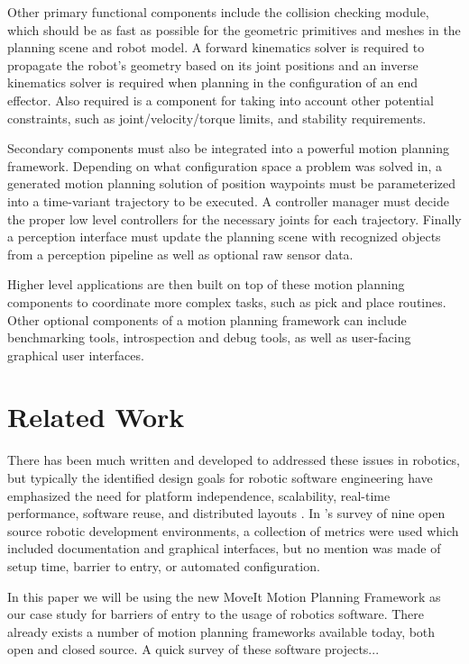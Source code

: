 \documentclass[10pt,journal,compsoc]{joser1}
\begin{document}
{Other primary functional components include the collision checking module, which should be as fast as possible for the geometric primitives and meshes in the planning scene and robot model. A forward kinematics solver is required to propagate the robot's geometry based on its joint positions and an inverse kinematics solver is required when planning in the configuration of an end effector. Also required is a component for taking into account other potential constraints, such as joint/velocity/torque limits, and stability requirements. 

Secondary components must also be integrated into a powerful motion planning framework. Depending on what configuration space a problem was solved in, a generated motion planning solution of position waypoints must be parameterized into a time-variant trajectory to be executed. A controller manager must decide the proper low level controllers for the necessary joints for each trajectory. Finally a perception interface must update the planning scene with recognized objects from a perception pipeline as well as optional raw sensor data.

Higher level applications are then built on top of these motion planning components to coordinate more complex tasks, such as pick and place routines. Other optional components of a motion planning framework can include benchmarking tools, introspection and debug tools, as well as user-facing graphical user interfaces. 


\section{Related Work}

There has been much written and developed to addressed these issues in robotics, but typically the identified design goals for robotic software engineering have emphasized the need for platform independence, scalability, real-time performance, software reuse, and distributed layouts \cite{realtime_framework, collett2005player, kramer2007development}. In \cite{kramer2007development}'s survey of nine open source robotic development environments, a collection of metrics were used which included documentation and graphical interfaces, but no mention was made of setup time, barrier to entry, or automated configuration. 

In this paper we will be using the new MoveIt Motion Planning Framework as our case study for barriers of entry to the usage of robotics software. There already exists a number of motion planning frameworks available today, both open and closed source. A quick survey of these software projects...

}
\end{document}
